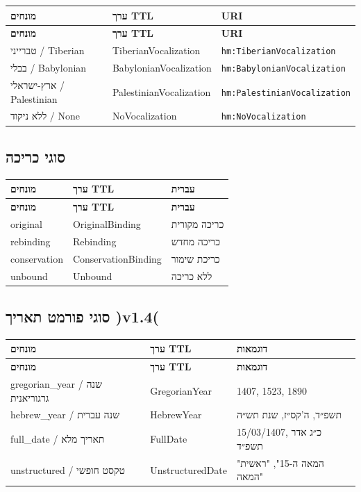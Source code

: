 \documentclass[12pt,a4paper]{article}
\newcommand{\ttlprop}[1]{\texttt{#1}}
\begin{document}
\begin{longtable}{|p{4cm}|L{5cm}|L{7cm}|}
\hline
\textbf{מונחים} & \textbf{ערך TTL} & \textbf{URI} \\
\hline
\endfirsthead
\hline
\textbf{מונחים} & \textbf{ערך TTL} & \textbf{URI} \\
\hline
\endhead
\hline
\endfoot
טברייני / Tiberian & TiberianVocalization & \ttlprop{hm:TiberianVocalization} \\
\hline
בבלי / Babylonian & BabylonianVocalization & \ttlprop{hm:BabylonianVocalization} \\
\hline
ארץ-ישראלי / Palestinian & PalestinianVocalization & \ttlprop{hm:PalestinianVocalization} \\
\hline
ללא ניקוד / None & NoVocalization & \ttlprop{hm:NoVocalization} \\
\hline
\end{longtable}

\subsection{סוגי כריכה}

\begin{longtable}{|p{4cm}|L{5cm}|L{7cm}|}
\hline
\textbf{מונחים} & \textbf{ערך TTL} & \textbf{עברית} \\
\hline
\endfirsthead
\hline
\textbf{מונחים} & \textbf{ערך TTL} & \textbf{עברית} \\
\hline
\endhead
\hline
\endfoot
original & OriginalBinding & כריכה מקורית \\
\hline
rebinding & Rebinding & כריכה מחדש \\
\hline
conservation & ConservationBinding & כריכת שימור \\
\hline
unbound & Unbound & ללא כריכה \\
\hline
\end{longtable}

\subsection{סוגי פורמט תאריך )v1.4(}

\begin{longtable}{|p{4cm}|L{5cm}|L{7cm}|}
\hline
\textbf{מונחים} & \textbf{ערך TTL} & \textbf{דוגמאות} \\
\hline
\endfirsthead
\hline
\textbf{מונחים} & \textbf{ערך TTL} & \textbf{דוגמאות} \\
\hline
\endhead
\hline
\endfoot
gregorian\_year / שנה גרגוריאנית & GregorianYear & 1407, 1523, 1890 \\
\hline
hebrew\_year / שנה עברית & HebrewYear & תשפ״ד, ה'קס״ז, שנת תש״ה \\
\hline
full\_date / תאריך מלא & FullDate & 15/03/1407, כ״ג אדר תשפ״ד \\
\hline
unstructured / טקסט חופשי & UnstructuredDate & "המאה ה-15", "ראשית המאה" \\
\hline
\end{longtable}
\end{document}
